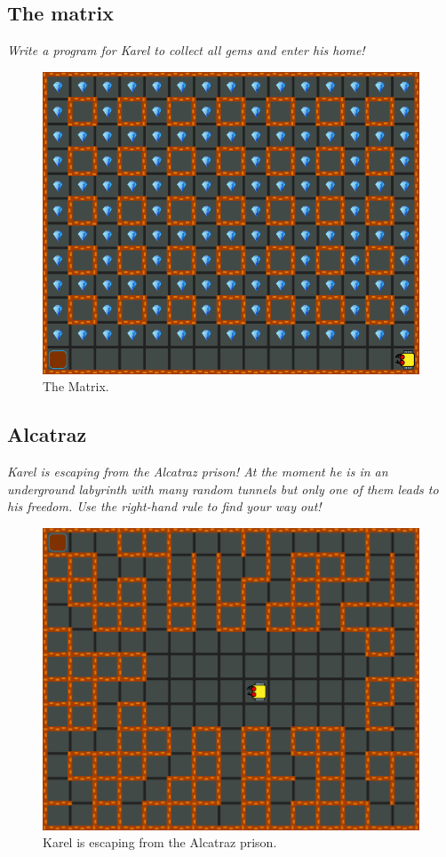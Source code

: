 {{\subsection{The matrix}

{\em Write a program for Karel to collect all gems and enter his home!}

\begin{figure}[!ht]
\begin{center}
\includegraphics[height=0.4\textwidth]{img/f11.png}
\end{center}
\vspace{-4mm}
\caption{The Matrix.}
\label{fig:f11}
\end{figure}
\vspace{-1cm}



\subsection{Alcatraz}

{\em Karel is escaping from the Alcatraz prison! At the moment he is in an underground labyrinth with many random tunnels but only one of them leads to his freedom. Use the right-hand rule to find your way out!}


\begin{figure}[!ht]
\begin{center}
\includegraphics[height=0.4\textwidth]{img/f12.png}
\end{center}
\vspace{-4mm}
\caption{Karel is escaping from the Alcatraz prison.}
\label{fig:f12}
\vspace{-1cm}
\end{figure}
\newpage


}}
